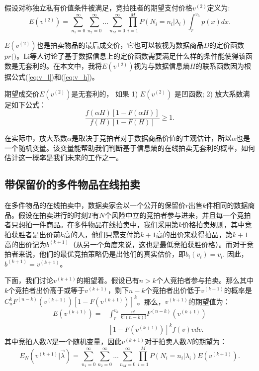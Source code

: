 \begin{defn}[竞拍胜者支付价格]
	\label{winning price definition}
	假设对称独立私有价值条件被满足，竞拍胜者的期望支付价格$v^{(2)}$定义为:
	\begin{equation}
	E(v^{(2)})=\sum_{n_1=0}^{\infty}\sum_{n_2=0}^{\infty}...\sum_{n_M=0}^{\infty}\prod_{i=1}^{M}P(N_i=n_i|\lambda_i)\int_{r}^{v_h}p(x)dx.
	\end{equation}
\end{defn}

$E(v^{(2)})$也是拍卖物品的最后成交价，它也可以被视为数据商品$D$的定价函数$pr(\dot)$。Li\cite{li2017first}等人讨论了基于数据信息上的定价函数需要满足什么样的条件能使得该函数是无套利的。在本文中，我将$E(v^{(2)})$视为与数据信息熵$H$的联系函数因为根据公式(\ref{eq:v_l})和(\ref{eq:v_h})。

\begin{prop}
\label{proposition2}
	期望成交价$E(v^{(2)})$是无套利的， 如果 1) $E(v^{(2)})$ 是凹函数; 2) 放大系数满足如下公式：
	\begin{equation}
		\frac{f(\alpha H)[1-F(\alpha H)]}{f(H)[1-F(H)]} \ge 1. 
	\end{equation}
\end{prop}

在实际中，放大系数$\alpha$是取决于竞拍者对于数据商品价值的主观估计，所以$\alpha$也是一个随机变量。该变量能帮助我们判断基于信息熵的在线拍卖无套利的概率，如何估计这一概率是我们未来的工作之一。

\subsection{带保留价的多件物品在线拍卖}
在多件物品的在线拍卖中，数据卖家会以一个公开的保留价$r$出售$k$件相同的数据商品。假设在拍卖进行的时刻$T$有$N$个风险中立的竞拍者参与进来，并且每一个竞拍者只想拍一件商品。在多件物品在线拍卖中，我们采用第$k$价格拍卖规则，其中竞拍获胜者是出价前$k$高的人，他们只需支付第$k+1$高的出价来获得拍品，第$k+1$高的出价记为$b^{(k+1)}$（从另一个角度来说，这也是最低竞拍获胜价格）。而对于竞拍者来说，他们的最优竞拍策略仍是出他们的真实估价，即$b_i(v_i)=v_i$. 因此， $b^{(k+1)}=v^{(k+1)}$。

下面，我们讨论$v^{(k+1)}$的期望着。假设已有$n>k$个人竞拍者参与拍卖。那么其中$k$个竞拍者出价高于或等于$v^{(k+1)}$，剩下$n-k$个竞拍者出价低于$v^{(k+1)}$的概率是$C^{k}_{n}F^{(n-k)}(v^{(k+1)})[1-F(v^{(k+1)})]^k$。那么，$v^{(k+1)}$的期望值为：
\begin{equation}
\begin{aligned}
	E(v^{(k+1)}) =&\int_{r}^{v_h}\frac{n!}{k!(n-k)!}F^{(n-k)}(v^{(k+1)})\\
&[1-F(v^{(k+1)})]^kf(v)vdv.
\end{aligned}
\end{equation}
其中竞拍人数$N$是一个随机变量，因此$v^{(k+1)}$对于拍卖人数$N$的期望为：
\begin{equation}
E_N(v^{(k+1)}|\vec{\lambda}) = \sum_{n_1=0}^{\infty}\sum_{n_2=0}^{\infty}...\sum_{n_M=0}^{\infty}\prod_{i=1}^{M}P(N_i=n_i|\lambda_i)E(v^{(k+1)}).
\end{equation}

